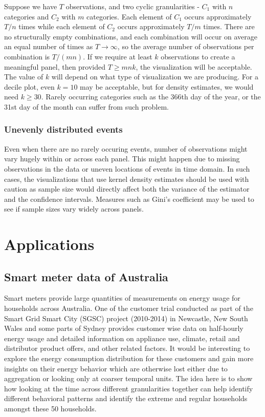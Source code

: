 \documentclass[12pt]{article}
\begin{document}
Suppose we have \(T\) observations, and two cyclic granularities -
\(C_1\) with \(n\) categories and \(C_2\) with \(m\) categories. Each
element of \(C_1\) occurs approximately \(T/n\) times while each element
of \(C_2\) occurs approximately \(T/m\) times. There are no structurally
empty combinations, and each combination will occur on average an equal
number of times as \(T\rightarrow\infty\), so the average number of
observations per combination is \(T/(mn)\). If we require at least \(k\)
observations to create a meaningful panel, then provided \(T \ge mnk\),
the visualization will be acceptable. The value of \(k\) will depend on
what type of visualization we are producing. For a decile plot, even
\(k=10\) may be acceptable, but for density estimates, we would need
\(k \ge 30\). Rarely occurring categories such as the 366th day of the
year, or the 31st day of the month can suffer from such problem.

\hypertarget{unevenly-distributed-events}{%
\subsubsection{Unevenly distributed
events}\label{unevenly-distributed-events}}

Even when there are no rarely occuring events, number of observations
might vary hugely within or across each panel. This might happen due to
missing observations in the data or uneven locations of events in time
domain. In such cases, the visualizations that use kernel density
estimates should be used with caution as sample size would directly
affect both the variance of the estimator and the confidence intervals.
Measures such as Gini's coefficient may be used to see if sample sizes
vary widely across panels.

\hypertarget{sec:application}{%
\section{Applications}\label{sec:application}}

\hypertarget{sec:smartmeter}{%
\subsection{Smart meter data of Australia}\label{sec:smartmeter}}

Smart meters provide large quantities of measurements on energy usage
for households across Australia. One of the customer trial
\citep{smart-meter} conducted as part of the Smart Grid Smart City
(SGSC) project (2010-2014) in Newcastle, New South Wales and some parts
of Sydney provides customer wise data on half-hourly energy usage and
detailed information on appliance use, climate, retail and distributor
product offers, and other related factors. It would be interesting to
explore the energy consumption distribution for these customers and gain
more insights on their energy behavior which are otherwise lost either
due to aggregation or looking only at coarser temporal units. The idea
here is to show how looking at the time across different granularities
together can help identify different behavioral patterns and identify
the extreme and regular households amongst these 50 households.
\end{document}
